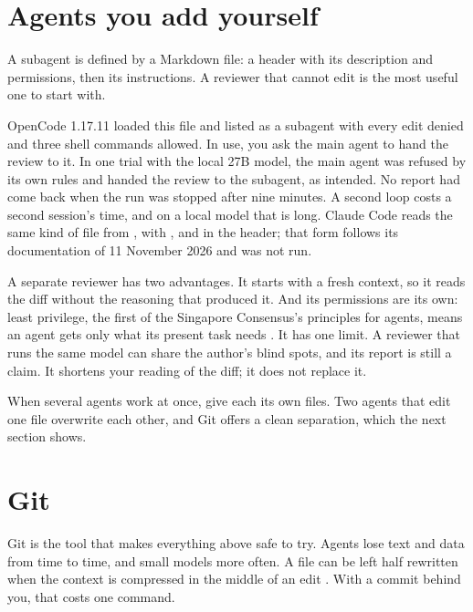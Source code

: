 \documentclass[11pt,a4paper]{article}
\begin{document}
\section{Agents you add yourself}
\label{sec:subagents}

A subagent is defined by a Markdown file: a header with its description and
permissions, then its instructions. A reviewer that cannot edit is the most
useful one to start with.



OpenCode 1.17.11 loaded this file and listed  as a subagent
with every edit denied and three shell commands allowed. In use, you ask the
main agent to hand the review to it. In one trial with the local 27B model,
the main agent was refused  by its own rules and handed the
review to the subagent, as intended. No report had come back when the run was
stopped after nine minutes. A second loop costs a second session's time, and
on a local model that is long. Claude Code reads the same kind of file from
, with ,  and 
in the header; that form follows its documentation of 11 November 2026 and
was not run.

A separate reviewer has two advantages. It starts with a fresh context, so it
reads the diff without the reasoning that produced it. And its permissions
are its own: least privilege, the first of the Singapore Consensus's
principles for agents, means an agent gets only what its present task needs
\parencite{casper2026singapore}. It has one limit. A reviewer that runs the
same model can share the author's blind spots, and its report is still a
claim. It shortens your reading of the diff; it does not replace it.

When several agents work at once, give each its own files. Two agents that
edit one file overwrite each other, and Git offers a clean separation, which
the next section shows.

\section{Git}
\label{sec:git}

Git is the tool that makes everything above safe to try. Agents lose text and
data from time to time, and small models more often. A file can be left half
rewritten when the context is compressed in the middle of an edit
\parencite{eren2026agenticcoding}. With a commit behind you, that costs one
command.
\end{document}
